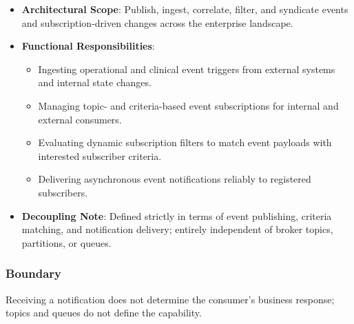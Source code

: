 \begin{itemize}

\item
\textbf{Architectural Scope}: Publish, ingest, correlate, filter, and syndicate events and subscription-driven changes across the enterprise landscape.



\item
\textbf{Functional Responsibilities}:


\begin{itemize}

\item
Ingesting operational and clinical event triggers from external systems and internal state changes.



\item
Managing topic- and criteria-based event subscriptions for internal and external consumers.



\item
Evaluating dynamic subscription filters to match event payloads with interested subscriber criteria.



\item
Delivering asynchronous event notifications reliably to registered subscribers.



\end{itemize}


\item
\textbf{Decoupling Note}: Defined strictly in terms of event publishing, criteria matching, and notification delivery; entirely independent of broker topics, partitions, or queues.



\end{itemize}
\subsubsection*{Boundary}

Receiving a notification does not determine the consumer's business response; topics and queues do not define the capability.

